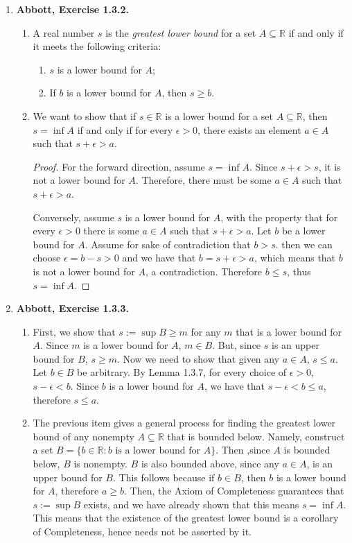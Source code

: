 \documentclass{article}
\newcommand{\R}{\mathbb{R}}
\newcommand{\exc}[2][Abbott]{\item \textbf{#1, Exercise #2.}}
\begin{document}
\begin{enumerate}
	\exc{1.3.2}
	\begin{enumerate}
		\item A real number $s$ is the \textit{greatest lower bound} for a set $A \subseteq \R$ if and only if it meets the following criteria:
		      \begin{enumerate}
		      	\item $s$ is a lower bound for $A$;
		      	\item If $b$ is a lower bound for $A$, then $s \geq b$.
		      \end{enumerate}
		\item We want to show that if $s \in \R$ is a lower bound for a set $A \subseteq \R$, then $s = \inf A$ if and only if for every $\epsilon > 0$, there exists an element $a \in A$ such that $s + \epsilon > a$.
		      \begin{proof}
		      	For the forward direction, assume $s = \inf A$. Since $s + \epsilon > s$, it is not a lower bound for $A$. Therefore, there must be some $a \in A$ such that $s + \epsilon > a$.
		      			      			      		      	      		      	      	    
		      	Conversely, assume $s$ is a lower bound for $A$, with the property that for every $\epsilon > 0$ there is some $a \in A$ such that $ s + \epsilon > a$. Let $b$ be a lower bound for $A$. Assume for sake of contradiction that $b > s$. then we can choose $\epsilon = b - s > 0$ and we have that $b = s + \epsilon > a$, which means that $b$ is not a lower bound for $A$, a contradiction. Therefore $b \leq s$, thus $s = \inf A$.
		      \end{proof}
	\end{enumerate}
				      	      
	\pagebreak
	\exc{1.3.3}
				      	      
	\begin{enumerate}
		\item First, we show that $s := \sup B \geq m$ for any $m$ that is a lower bound for $A$. Since $m$ is a lower bound for $A$, $m \in B$. But, since $s$ is an upper bound for $B$, $s \geq m$. Now we need to show that given any $a \in A$, $s \leq a$. Let $b \in B$ be arbitrary. By Lemma 1.3.7, for every choice of $\epsilon > 0$, $s-\epsilon < b$. Since $b$ is a lower bound for $A$, we have that $s-\epsilon < b \leq a$, therefore $s \leq a$. 
		      		      		      	      	      	      	          
		\item The previous item gives a general process for finding the greatest lower bound of any nonempty $A \subseteq \R$ that is bounded below. Namely, construct a set $B = \{b \in \R : b \text{ is a lower bound for }A\}$. Then ,since $A$ is bounded below, $B$ is nonempty. $B$ is also bounded above, since any $a \in A$, is an upper bound for $B$. This follows because if $b \in B$, then $b$ is a lower bound for $A$, therefore $a \geq b$. Then, the Axiom of Completeness guarantees that $s := \sup B$ exists, and we have already shown that this means $s = \inf A$. This means that the existence of the greatest lower bound is a corollary of Completeness, hence needs not be asserted by it.
		      		      		      	      	      	      	          

\end{enumerate}
\end{enumerate}
\end{document}
